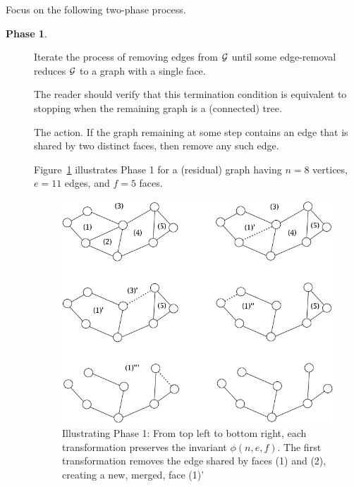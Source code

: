 \noindent
Focus on the following two-phase process.
\begin{description}
\item[{\bf Phase 1}.]
Iterate the process of removing edges from $\mbox{$\cal G$}$ until some edge-removal reduces $\mbox{$\cal G$}$ to a graph with a single face.

\smallskip

The reader should verify that this termination condition is equivalent to stopping when the remaining graph is a (connected) tree.

\medskip

{\sf The action}.
If the graph remaining at some step contains an edge that is shared by two distinct faces, then remove any such edge.

\smallskip

Figure~\ref{fig:planarStep1} illustrates Phase 1 for a (residual) graph having $n=8$ vertices, $e=11$ edges, and $f=5$ faces.
\begin{figure}[hbt]
\begin{center}
   \includegraphics[scale=0.35]{FiguresGraph/planarStep1}
\caption{Illustrating Phase 1: From top left to bottom right, each transformation preserves the invariant $\phi(n,e,f)$.  The first transformation removes the edge shared by faces (1) and (2), creating a new, merged, face (1)'}
  \label{fig:planarStep1}
\end{center}
\end{figure}

\medskip


\end{description}
